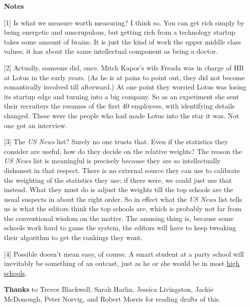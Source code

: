                   \textbf{Notes}

[1] Is what we measure worth measuring? I think so. You can get
                  rich simply by being energetic and unscrupulous, but getting
                  rich from a technology startup takes some amount of brains. It
                  is just the kind of work the upper middle class values; it has
                  about the same intellectual component as being a doctor.

[2] Actually, someone did, once. Mitch Kapor's wife Freada was
                  in charge of HR at Lotus in the early years. (As he is at
                  pains to point out, they did not become romantically involved
                  till afterward.) At one point they worried Lotus was losing
                  its startup edge and turning into a big company. So as an
                  experiment she sent their recruiters the resumes of the first
                  40 employees, with identifying details changed. These were the
                  people who had made Lotus into the star it was. Not one got an
                  interview.

[3] The \emph{US News} list? Surely no one trusts that. Even if
                  the statistics they consider are useful, how do they decide on
                  the relative weights? The reason the \emph{US News} list is
                  meaningful is precisely because they are so intellectually
                  dishonest in that respect. There is no external source they
                  can use to calibrate the weighting of the statistics they use;
                  if there were, we could just use that instead. What they must
                  do is adjust the weights till the top schools are the usual
                  suspects in about the right order. So in effect what the
                  \emph{US News} list tells us is what the editors think the top
                  schools are, which is probably not far from the conventional
                  wisdom on the matter. The amusing thing is, because some
                  schools work hard to game the system, the editors will have to
                  keep tweaking their algorithm to get the rankings they
                  want.

[4] Possible doesn't mean easy, of course. A smart student at a
                  party school will inevitably be something of an outcast, just
                  as he or she would be in most
                  \href{http://www.paulgraham.com/nerds.html}{high schools}.


                  \textbf{Thanks} to Trevor Blackwell, Sarah Harlin, Jessica
                  Livingston, Jackie McDonough, Peter Norvig, and Robert Morris
                  for reading drafts of this.


              
            
          
